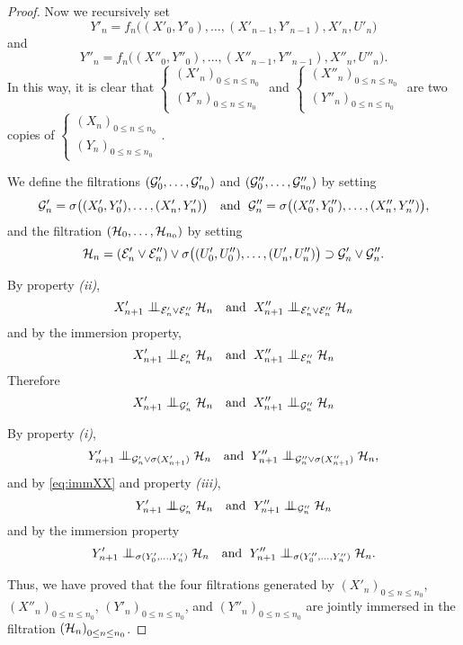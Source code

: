 \documentclass[12pt,a4paper]{article}
\begin{document}
\begin{proof}
Now we recursively set 
$$
Y'_n = f_n\bigl((X'_0,Y'_0), \ldots, (X'_{n-1}, Y'_{n-1}), X'_n, U'_n\bigr)
$$
and 
$$
Y''_n = f_n\bigl((X''_0,Y''_0), \ldots, (X''_{n-1}, Y''_{n-1}), X''_n, U''_n\bigr).
$$
In this way, it is clear that $\left\{\begin{smallmatrix} {(X'_n)}_{0 \leq n \leq n_0} \\ 
{(Y'_n)}_{0 \leq n \leq n_0}
\end{smallmatrix}\right.$ and 
$\left\{\begin{smallmatrix} {(X''_n)}_{0 \leq n \leq n_0} \\ 
{(Y''_n)}_{0 \leq n \leq n_0}
\end{smallmatrix}\right.$
are two copies of 
$\left\{\begin{smallmatrix} {(X_n)}_{0 \leq n \leq n_0} \\ 
{(Y_n)}_{0 \leq n \leq n_0}
\end{smallmatrix}\right.$.

We define the filtrations  $(\mathcal{G}'_0, \ldots, \mathcal{G}'_{n_0})$ 
and  $(\mathcal{G}''_0, \ldots, \mathcal{G}''_{n_0})$ by setting 
$$
\mathcal{G}'_n = \sigma\bigl((X'_0,Y'_0), \ldots, (X'_n, Y'_n)\bigr) 
\quad \text{and }\;
\mathcal{G}''_n = \sigma\bigl((X''_0,Y''_0), \ldots, (X''_n, Y''_n)\bigr), 
$$
and  the filtration $(\mathcal{H}_0, \ldots, \mathcal{H}_{n_0})$ by setting 
$$
\mathcal{H}_n = (\mathcal{E}'_n \vee \mathcal{E}''_n) \vee \sigma\bigl((U'_0,U''_0), \ldots, (U'_n, U''_n) \bigr) 
\supset  \mathcal{G}'_n \vee \mathcal{G}''_n.
$$

By property {\it(ii)}, 
$$
X'_{n+1} \indep_{\EEE'_n\vee\EEE''_n} \HH_n 
\quad \text{and }\;
X''_{n+1} \indep_{\EEE'_n\vee\EEE''_n} \HH_n 
$$
and by the immersion property, 
\begin{equation}\label{eq:immX}
X'_{n+1} \indep_{\EEE'_n} \HH_n 
\quad \text{and }\;
X''_{n+1} \indep_{\EEE''_n} \HH_n 
\end{equation}
Therefore
\begin{equation}\label{eq:immXX}
X'_{n+1} \indep_{\GG'_n} \HH_n 
\quad \text{and }\;
X''_{n+1} \indep_{\GG''_n} \HH_n 
\end{equation}


By property {\it(i)}, 
$$
Y'_{n+1} \indep_{\GG'_n \vee \sigma(X'_{n+1})} \HH_n 
\quad \text{and }\;
Y''_{n+1} \indep_{\GG''_n \vee \sigma(X''_{n+1})} \HH_n, 
$$
and by \eqref{eq:immXX} and property {\it(iii)},
$$
Y'_{n+1} \indep_{\GG'_n} \HH_n 
\quad \text{and }\;
Y''_{n+1} \indep_{\GG''_n} \HH_n
$$
and  by the immersion property 
$$
Y'_{n+1} \indep_{\sigma(Y'_0, \ldots, Y'_n)} \HH_n 
\quad \text{and }\;
Y''_{n+1} \indep_{\sigma(Y''_0, \ldots, Y''_n)} \HH_n.
$$

Thus, we have proved that the four filtrations generated by 
${(X'_n)}_{0 \leq n \leq n_0}$, ${(X''_n)}_{0 \leq n \leq n_0}$, 
${(Y'_n)}_{0 \leq n \leq n_0}$, and ${(Y''_n)}_{0 \leq n \leq n_0}$ 
are jointly immersed in the filtration ${(\mathcal{H}_n)}_{0 \leq n \leq n_0}$.
\end{proof}
\end{document}
